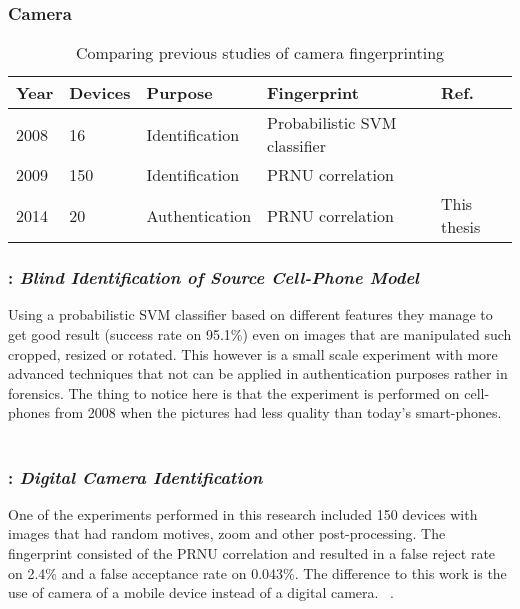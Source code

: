 \subsubsection*{Camera}\label{earlier:camera}
\begin{table}[H]
\centering
\begin{tabular}{| p{1cm} | p{1cm} | p{2.7cm} | p{3cm} | p{2.5cm} |}
  Year & Devices & Purpose & Fingerprint & Ref. \\ \hline
  2008 & 16 & Identification &  Probabilistic SVM classifier &~\cite[]{sensor:camera:blind} \\
  2009 & 150 & Identification & PRNU correlation &~\cite[]{sensor:camera:DCIdent} \\
  2014 & 20 & Authentication & PRNU correlation & This thesis \\ \hline
\end{tabular}
\caption{Comparing previous studies of camera fingerprinting} \label{table:prevCamera}
\end{table}

\subsubsection*{\cite{sensor:camera:blind}: \textit{Blind Identification of Source Cell-Phone Model}}
Using a probabilistic SVM classifier based on different features they manage to get good result (success rate on 95.1\%) even on images that are manipulated such cropped, resized or rotated. This however is a small scale experiment with more advanced techniques that not can be applied in authentication purposes rather in forensics. The thing to notice here is that the experiment is performed on cell-phones from 2008 when the pictures had less quality than today’s smart-phones.
~\cite[]{sensor:camera:blind}

\subsubsection*{\cite{sensor:camera:DCIdent}: \textit{Digital Camera Identification}}
One of the experiments performed in this research included 150 devices with images that had random motives, zoom and other post-processing. The fingerprint consisted of the PRNU correlation and resulted in a false reject rate on 2.4\% and a false acceptance rate on 0.043\%. The difference to this work is the use of camera of a mobile device instead of a digital camera.
~\cite[]{sensor:camera:DCIdent}.
